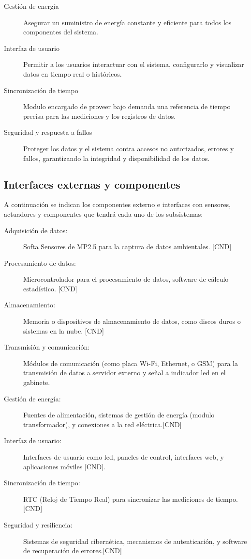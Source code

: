 \documentclass[
11pt, %
codirector, %
]{charter}
\begin{document}
\begin{description}
	\item[Gestión de energía] Asegurar un suministro de energía constante y eficiente para todos los componentes del sistema.
	
	\item[Interfaz de usuario] Permitir a los usuarios interactuar con el sistema, configurarlo y visualizar datos en tiempo real o históricos.
	
	\item[Sincronización de tiempo] Modulo encargado de proveer bajo demanda una referencia de tiempo precisa para las mediciones y los registros de datos.
	
	
	
	\item[Seguridad y respuesta a fallos] Proteger los datos y el sistema contra accesos no autorizados, errores y fallos, garantizando la integridad y disponibilidad de los datos.
\end{description}


\subsection{Interfaces externas y componentes}
 A continuación se indican los componentes externo e interfaces con sensores, actuadores y componentes que tendrá cada uno de los subsistemas:
	\begin{description}
		\item[Adquisición de datos:] Softa Sensores de MP2.5 para la captura de datos ambientales. [CND]
		\item[Procesamiento de datos:] Microcontrolador para el procesamiento de datos, software de cálculo estadístico. [CND]
		\item[Almacenamiento:] Memoria o dispositivos de almacenamiento de datos, como discos duros o sistemas en la nube. [CND]
		\item[Transmisión y comunicación:] Módulos de comunicación (como placa Wi-Fi, Ethernet, o GSM) para la transmisión de datos a servidor externo y señal a indicador led en el gabinete.
		\item[Gestión de energía:] Fuentes de alimentación, sistemas de gestión de energía (modulo transformador), y conexiones a la red eléctrica.[CND]
		\item[Interfaz de usuario:] Interfaces de usuario como led, paneles de control, interfaces web, y aplicaciones móviles [CND].
		\item[Sincronización de tiempo:] RTC (Reloj de Tiempo Real) para sincronizar las mediciones de tiempo. [CND]
		\item[Seguridad y resiliencia:] Sistemas de seguridad cibernética, mecanismos de autenticación, y software de recuperación de errores.[CND]
	\end{description}
	
\end{document}
